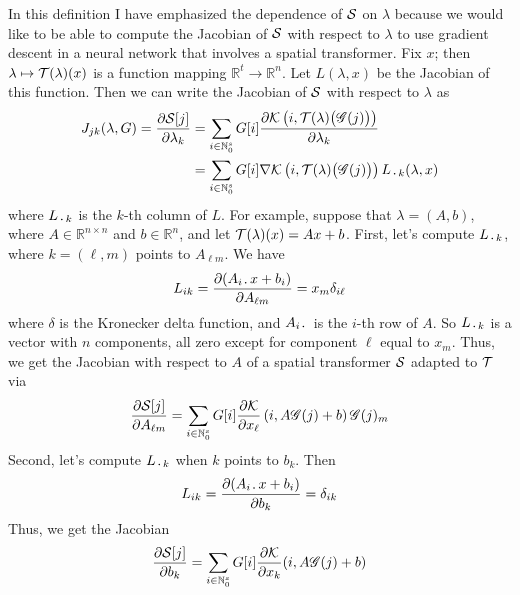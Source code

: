\documentclass{article}
\newcommand{\R}{\mathbb{R}}
\newcommand{\Natural}{\mathbb{N}}
\begin{document}
	In this definition I have emphasized the dependence of \(\mathcal{S}\) on \(\lambda\) because we would like to be able to compute the Jacobian of \(\mathcal{S}\) with respect to \(\lambda\) to use gradient descent in a neural network that involves a spatial transformer. Fix \(x\); then \(\lambda \mapsto \mathcal{T}(\lambda)(x)\) is a function mapping \(\R^t \to \R^n\). Let \(L(\lambda, x)\) be the Jacobian of this function. Then we can write the Jacobian of \(\mathcal{S}\) with respect to \(\lambda\) as
	\begin{align}\label{eq:spatial_transformer_jacobian}
		J_{jk}(\lambda, G) = \frac{\partial \spatialtransf[j]}{\partial \lambda_k} &= \sum_{i\in \Natural_0^s} G[i]\frac{\partial\mathcal{K}\left(i,\transf(\lambda)\big(\grid(j)\big)\right)}{\partial \lambda_k}\\ \notag
		&= \sum_{i \in \Natural_0^s} G[i] \nabla\mathcal{K}\left(i, \transf(\lambda)\big(\grid(j)\big)\right)L_{\blah k}(\lambda, x)
	\end{align}
	where \(L_{\,\boldsymbol{\cdot}\, k}\) is the \(k\)-th column of \(L\). For example, suppose that \(\lambda = (A, b)\), where \(A \in \R^{n\times n}\) and \(b \in \R^n\), and let \(\mathcal{T}(\lambda)(x) = Ax + b\). First, let's compute \(L_{\,\boldsymbol{\cdot}\, k}\), where \(k = (\ell, m)\) points to \(A_{\ell m}\). We have \begin{equation*}
		L_{ik} = \frac{\partial(A_{i\,\boldsymbol{\cdot}\,}x + b_i)}{\partial A_{\ell m}} = x_m\delta_{i\ell}
	\end{equation*}
	where \(\delta\) is the Kronecker delta function, and \(A_{i\,\boldsymbol{\cdot}\,}\) is the \(i\)-th row of \(A\). So \(L_{\,\boldsymbol{\cdot}\, k}\) is a vector with \(n\) components, all zero except for component \(\ell\) equal to \(x_m\). Thus, we get the Jacobian with respect to \(A\) of a spatial transformer \(\mathcal{S}\) adapted to \(\mathcal{T}\) via
	\begin{equation*}
		\frac{\partial \spatialtransf[j]}{\partial A_{\ell m}} = \sum_{i \in \Natural_0^s}G[i] \frac{\partial \mathcal{K}}{\partial x_\ell}\left(i, A\grid(j)+b\right) \grid(j)_m
	\end{equation*}
	Second, let's compute \(L_{\,\boldsymbol{\cdot}\, k}\) when \(k\) points to \(b_k\). Then
	\begin{equation*}
		L_{ik} = \frac{\partial(A_{i \,\boldsymbol{\cdot}\,} x + b_i)}{\partial b_k} = \delta_{ik}
	\end{equation*}
	Thus, we get the Jacobian
	\begin{equation*}
		\frac{\partial \spatialtransf[j]}{\partial b_k} = \sum_{i \in \Natural_0^s} G[i] \frac{\partial \mathcal{K}}{\partial x_k}(i, A\grid(j) + b)
	\end{equation*}
\end{document}
